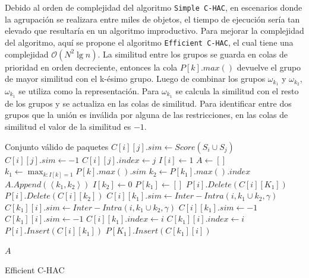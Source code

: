 Debido al orden de complejidad del algoritmo \texttt{Simple C-HAC}, en escenarios donde la agrupación se realizara entre miles de objetos, el tiempo de ejecución sería tan elevado que resultaría en un algoritmo improductivo. Para mejorar la complejidad del algoritmo, aquí se propone el algoritmo \texttt{Efficient C-HAC}, el cual tiene una complejidad $\mathcal{O}(N^{2}\lg n)$. La similitud entre los grupos se guarda en colas de prioridad en orden decreciente, entonces la cola $P\left[k\right].max()$ devuelve el grupo de mayor similitud con el k-ésimo grupo. Luego de combinar los grupos $\omega_{k_{1}}$ y $\omega_{k_{2}}$, $\omega_{k_{1}}$ se utiliza como la representación. Para $\omega_{k_{1}}$ se calcula la similitud con el resto de los grupos y se actualiza en las colas de similitud. Para identificar entre dos grupos que la unión es inválida por alguna de las restricciones, en las colas de similitud el valor de la similitud es $-1$.

\begin{algorithm}[H]
\begin{algorithmic}[1]
\ENSURE Conjunto válido de paquetes
			\STATE $C[i][j].sim \leftarrow Score(S_i \cup S_j)$
		\ELSE
			\STATE $C[i][j].sim \leftarrow -1$
		\ENDIF
		\STATE $C[i][j].index \leftarrow j$
	\ENDFOR
	\STATE $I[i] \leftarrow 1$
\ENDFOR
\STATE $A \leftarrow []$
	\STATE $k_1 \leftarrow \max_{k:I[k]=1}{P[k].max().sim}$
		\BREAK
	\ENDIF
	\STATE $k_2 \leftarrow P[k_1].max().index$
	\STATE $A.Append(\left\langle k_1,k_2 \right\rangle)$
	\STATE $I[k_2] \leftarrow 0$
	\STATE $P[k_1] \leftarrow []$
		\STATE $P[i].Delete(C[i][K_1])$
		\STATE $P[i].Delete(C[i][k_2])$
			\STATE $C[i][k_1].sim \leftarrow Inter-Intra(i,k_1 \cup k_2,\gamma)$
			\STATE $C[k_1][i].sim \leftarrow Inter-Intra(i,k_1 \cup k_2,\gamma)$
		\ELSE
			\STATE $C[i][k_1].sim \leftarrow -1$
			\STATE $C[k_1][i].sim \leftarrow -1$
		\ENDIF
		\STATE $C[i][k_1].index \leftarrow i$
		\STATE $C[k_1][i].index \leftarrow i$		
		\STATE $P[i].Insert(C[i][k_1])$
		\STATE $P[K_1].Insert(C[k_1][i])$		
	\ENDFOR
\ENDFOR

\RETURN $A$
\end{algorithmic}
\caption{Efficient C-HAC}\label{alg:Efficient C-HAC}
\end{algorithm}

